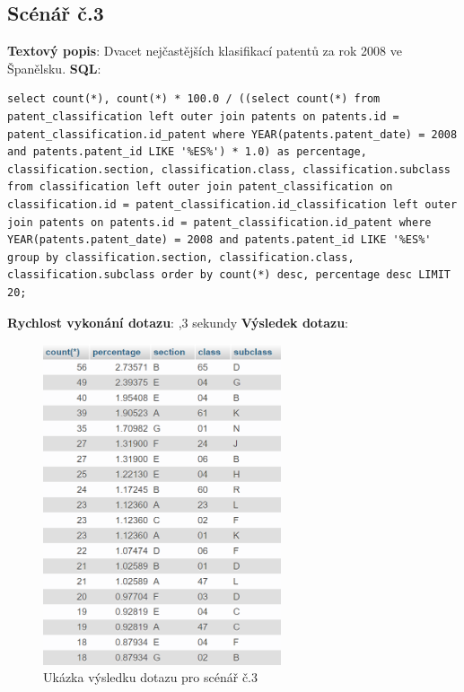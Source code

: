 \subsection{Scénář č.3}
\textbf{Textový popis}: Dvacet nejčastějších klasifikací patentů za rok 2008 ve Španělsku.
\newline
\textbf{SQL}:
\begin{lstlisting}[label = {lst:elements_a}]
select count(*), count(*) * 100.0 / ((select count(*) from patent_classification left outer join patents on patents.id = patent_classification.id_patent where YEAR(patents.patent_date) = 2008 and patents.patent_id LIKE '%ES%') * 1.0) as percentage, classification.section, classification.class, classification.subclass from classification left outer join patent_classification on classification.id = patent_classification.id_classification left outer join patents on patents.id = patent_classification.id_patent where YEAR(patents.patent_date) = 2008 and patents.patent_id LIKE '%ES%' group by classification.section, classification.class, classification.subclass order by count(*) desc, percentage desc LIMIT 20;
\end{lstlisting}
\textbf{Rychlost vykonání dotazu}: ,3 sekundy
\newline
\textbf{Výsledek dotazu}:
\begin{figure}[H]
\centering
\includegraphics[width=7cm]{img/scenare/scenar_3}
\caption{Ukázka výsledku dotazu pro scénář č.3}
\label{fig:scenar3}
\end{figure}

\newpage
